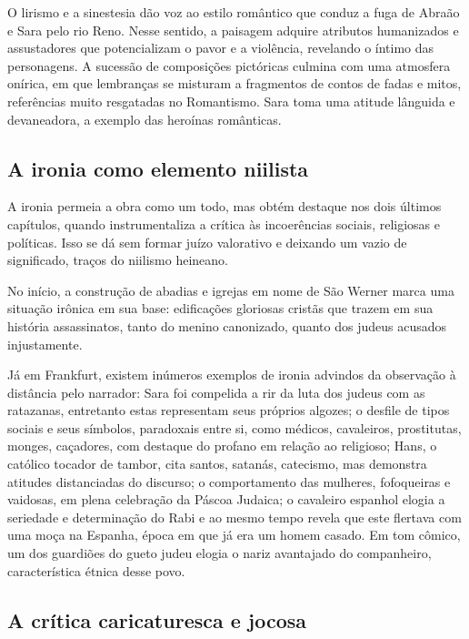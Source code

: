 \documentclass[12pt]{extarticle}
\begin{document}


O lirismo e a sinestesia dão voz ao estilo romântico que conduz a fuga
de Abraão e Sara pelo rio Reno. Nesse sentido, a paisagem adquire
atributos humanizados e assustadores que potencializam o pavor e a
violência, revelando o íntimo das personagens. A sucessão de composições
pictóricas culmina com uma atmosfera onírica, em que lembranças se
misturam a fragmentos de contos de fadas e mitos, referências muito
resgatadas no Romantismo. Sara toma uma atitude lânguida e devaneadora,
a exemplo das heroínas românticas.

\subsection{A ironia como elemento niilista}

A ironia permeia a obra como um todo, mas obtém destaque nos dois
últimos capítulos, quando instrumentaliza a crítica às incoerências
sociais, religiosas e políticas. Isso se dá sem formar juízo valorativo
e deixando um vazio de significado, traços do niilismo heineano.

No início, a construção de abadias e igrejas em nome de São Werner marca
uma situação irônica em sua base: edificações gloriosas cristãs que
trazem em sua história assassinatos, tanto do menino canonizado, quanto
dos judeus acusados injustamente.

Já em Frankfurt, existem inúmeros exemplos de ironia advindos da
observação à distância pelo narrador: Sara foi compelida a rir da luta
dos judeus com as ratazanas, entretanto estas representam seus próprios
algozes; o desfile de tipos sociais e seus símbolos, paradoxais entre
si, como médicos, cavaleiros, prostitutas, monges, caçadores, com
destaque do profano em relação ao religioso; Hans, o católico tocador de
tambor, cita santos, satanás, catecismo, mas demonstra atitudes
distanciadas do discurso; o comportamento das mulheres, fofoqueiras e
vaidosas, em plena celebração da Páscoa Judaica; o cavaleiro espanhol
elogia a seriedade e determinação do Rabi e ao mesmo tempo revela que
este flertava com uma moça na Espanha, época em que já era um homem
casado. Em tom cômico, um dos guardiões do gueto judeu elogia o nariz
avantajado do companheiro, característica étnica desse povo.

\subsection{A crítica caricaturesca e jocosa }
\end{document}
